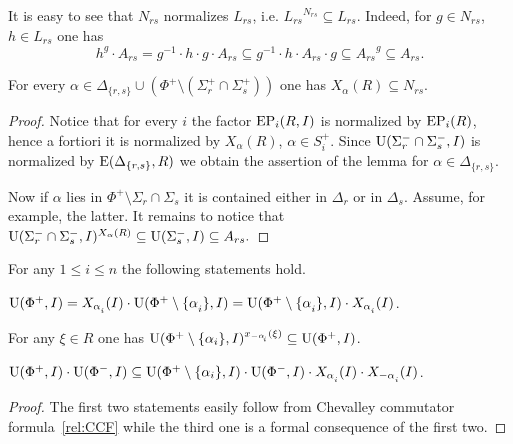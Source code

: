 It is easy to see that $N_{rs}$ normalizes $L_{rs}$, i.e. ${L_{rs}}^{N_{rs}} \subseteq L_{rs}$. 
Indeed, for $g\in N_{rs}$, $h\in L_{rs}$ one has
\begin{equation}\label{rel:NnormL} h^g \cdot A_{rs} = g^{-1} \cdot h \cdot g \cdot A_{rs} \subseteq g^{-1} \cdot h \cdot A_{rs} \cdot g \subseteq {A_{rs}}^g \subseteq A_{rs}.\end{equation}

\begin{lemma}\label{lemma:dv-normal} 
For every $\alpha \in \Delta_{\{r,s\}} \cup (\Phi^+ \setminus (\Sigma^+_r \cap \Sigma^+_s))$ one has $X_\alpha(R) \subseteq N_{rs}$. \end{lemma}
\begin{proof}
Notice that for every $i$ the factor $\operatorname{EP}_i(R, I)$ is normalized by $\operatorname{EP}_i(R)$, hence a fortiori it is normalized by $X_\alpha(R)$, $\alpha \in S_i^+$.
Since $\operatorname{U}(\Sigma_r^- \cap \Sigma_s^-, I)$ is normalized by $\operatorname{E}(\Delta_{\{r,s\}}, R)$ we obtain the assertion of the lemma for $\alpha \in \Delta_{\{r, s\}}$.

Now if $\alpha$ lies in $\Phi^+ \setminus \Sigma_r \cap \Sigma_s$ it is contained either in $\Delta_r$ or in $\Delta_s$.
Assume, for example, the latter. It remains to notice that $\operatorname{U}(\Sigma_r^- \cap \Sigma_s^-, I)^{X_\alpha(R)} \subseteq \operatorname{U}(\Sigma_s^-, I) \subseteq A_{rs}.$
\end{proof}

\begin{lemma}\label{lemma:dv_unipotent} For any $1\leq i\leq n$ the following statements hold. 
\begin{thmlist} \item \label{item-dvu1} $\U(\Phi^+, I) = X_{\alpha\ssub{i}}(I)\cdot \U(\Phi^+\setminus\{\alpha\ssub{i}\}, I) = \U(\Phi^+\setminus\{\alpha\ssub{i}\}, I)\cdot X_{\alpha\ssub{i}}(I)$.
\item \label{item-dvu2} For any $\xi\in R$ one has $\U(\Phi^+\setminus\{\alpha_i\}, I)^{x_{-\alpha\ssub{i}}(\xi)} \subseteq \U(\Phi^+, I)$.
\item \label{item-dvu3} $\U(\Phi^+, I)\cdot \U(\Phi^-, I) \subseteq \U(\Phi^+\setminus \{\alpha_i\}, I) \cdot \U(\Phi^-, I) \cdot X_{\alpha\ssub{i}}(I) \cdot X_{-\alpha\ssub{i}}(I)$.
\end{thmlist} \end{lemma}
\begin{proof} The first two statements easily follow from Chevalley commutator formula~\eqref{rel:CCF} while the third one is a formal consequence of the first two. \end{proof}

